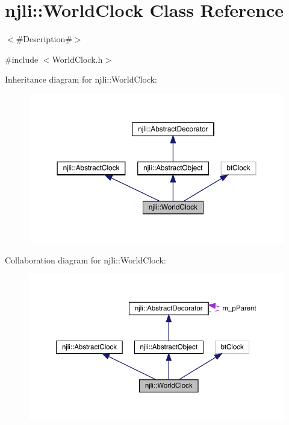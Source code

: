 \hypertarget{classnjli_1_1_world_clock}{}\section{njli\+:\+:World\+Clock Class Reference}
\label{classnjli_1_1_world_clock}


$<$\#\+Description\#$>$  




{\ttfamily \#include $<$World\+Clock.\+h$>$}



Inheritance diagram for njli\+:\+:World\+Clock\+:\nopagebreak
\begin{figure}[H]
\begin{center}
\leavevmode
\includegraphics[width=350pt]{classnjli_1_1_world_clock__inherit__graph}
\end{center}
\end{figure}


Collaboration diagram for njli\+:\+:World\+Clock\+:\nopagebreak
\begin{figure}[H]
\begin{center}
\leavevmode
\includegraphics[width=350pt]{classnjli_1_1_world_clock__coll__graph}
\end{center}
\end{figure}

